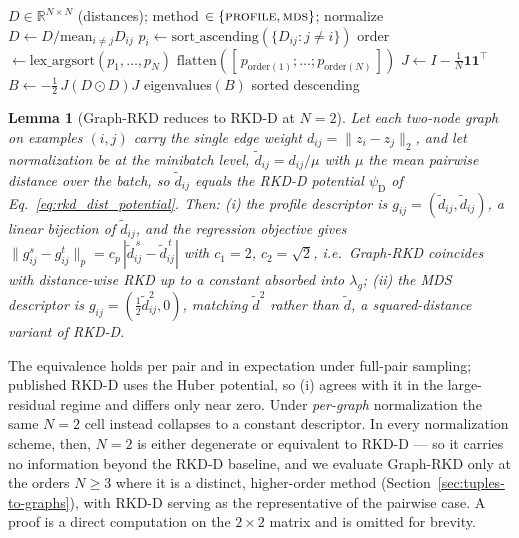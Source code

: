 \documentclass[11pt,letterpaper]{article}
\newtheorem{theorem}{Lemma}
\begin{document}
\begin{algorithm}[htbp]
\caption{Permutation-invariant graph embedding}
\label{alg:embedding}
\begin{algorithmic}[1]
\Require $D \in \mathbb{R}^{N \times N}$ (distances); method $\in \{\textsc{profile}, \textsc{mds}\}$; normalize
 
    \State $D \gets D / \mathrm{mean}_{i \neq j} D_{ij}$
\EndIf
{}
        \State $p_i \gets \mathrm{sort\_ascending}(\{ D_{ij} : j \neq i \})$ 
    \EndFor
    \State order $\gets \mathrm{lex\_argsort}(p_1, \ldots, p_N)$ 
    \State \Return $\mathrm{flatten}([\, p_{\mathrm{order}(1)} ; \ldots ; p_{\mathrm{order}(N)} \,])$ 
\Else {}
    \State $J \gets I - \tfrac{1}{N} \mathbf{1}\mathbf{1}^\top$
    \State $B \gets -\tfrac{1}{2}\, J (D \odot D) J$ 
    \State \Return eigenvalues$(B)$ sorted descending 
\EndIf
\end{algorithmic}
\end{algorithm}

\begin{theorem}[Graph-RKD reduces to RKD-D at $N=2$]
\label{lem:n2}
Let each two-node graph on examples $(i,j)$ carry the single edge weight
$d_{ij} = \lVert z_i - z_j \rVert_2$, and let normalization be at the minibatch level,
$\tilde{d}_{ij} = d_{ij}/\mu$ with $\mu$ the mean pairwise distance over the batch, so
$\tilde{d}_{ij}$ equals the RKD-D potential $\psi_{\mathrm{D}}$ of
Eq.~\ref{eq:rkd_dist_potential}. Then:
\emph{(i)} the profile descriptor is $g_{ij} = (\tilde{d}_{ij}, \tilde{d}_{ij})$, a
linear bijection of $\tilde{d}_{ij}$, and the regression objective gives
$\lVert g^{s}_{ij} - g^{t}_{ij} \rVert_p = c_p\,|\tilde{d}^{\,s}_{ij} - \tilde{d}^{\,t}_{ij}|$
with $c_1 = 2$, $c_2 = \sqrt{2}$, i.e.\ Graph-RKD coincides with distance-wise RKD up
to a constant absorbed into $\lambda_g$; \emph{(ii)} the MDS descriptor is
$g_{ij} = (\tfrac{1}{2}\tilde{d}_{ij}^{2}, 0)$, matching $\tilde{d}^{2}$ rather than
$\tilde{d}$, a squared-distance variant of RKD-D.
\end{theorem}

\noindent
The equivalence holds per pair and in expectation under full-pair sampling; published
RKD-D uses the Huber potential, so (i) agrees with it in the large-residual regime and
differs only near zero. Under \emph{per-graph} normalization the same $N=2$ cell instead
collapses to a constant descriptor. In every normalization scheme, then, $N = 2$ is
either degenerate or equivalent to RKD-D --- so it carries no information beyond the
RKD-D baseline, and we evaluate Graph-RKD only at the orders $N \geq 3$ where it is a
distinct, higher-order method (Section~\ref{sec:tuples-to-graphs}), with RKD-D serving as
the representative of the pairwise case. A proof is a direct computation on the
$2 \times 2$ matrix and is omitted for brevity.
\end{document}
